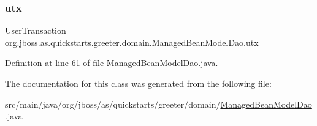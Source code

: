 \subsubsection{\texorpdfstring{utx}{utx}}
{\footnotesize\ttfamily User\+Transaction org.\+jboss.\+as.\+quickstarts.\+greeter.\+domain.\+Managed\+Bean\+Model\+Dao.\+utx\hspace{0.3cm}{\ttfamily [private]}}



Definition at line 61 of file Managed\+Bean\+Model\+Dao.\+java.



The documentation for this class was generated from the following file\+:\begin{DoxyCompactItemize}
\item 
src/main/java/org/jboss/as/quickstarts/greeter/domain/\hyperlink{_managed_bean_model_dao_8java}{Managed\+Bean\+Model\+Dao.\+java}\end{DoxyCompactItemize}
